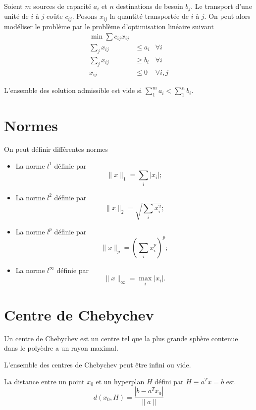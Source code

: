 \begin{myexem}
  Soient $m$ sources de capacité $a_i$ et
  $n$ destinations de besoin $b_j$.
  Le transport d'une unité de $i$ à $j$ coûte $c_{ij}$.
  Posons $x_{ij}$ la quantité transportée de $i$ à $j$.
  On peut alors modéliser le problème par le problème d'optimisation linéaire
  suivant
  \begin{align*}
    \min \sum c_{ij} x_{ij}\\
    \sum_j x_{ij} & \leq a_i & \forall i\\
    \sum_j x_{ij} & \geq b_i & \forall i\\
    x_{ij} & \leq 0 & \forall i,j
  \end{align*}

  L'ensemble des solution admissible est vide si
  $\sum_1^m a_i < \sum_1^n b_i$.
\end{myexem}

\section{Normes}
On peut définir différentes normes
\begin{itemize}
  \item La norme $l^1$ définie par
    \[ \|x\|_1 = \sum_i |x_i|; \]
  \item La norme $l^2$ définie par
    \[ \|x\|_2 = \sqrt{\sum_i x_i^2}; \]
  \item La norme $l^p$ définie par
    \[ \|x\|_p = \left(\sum_i x_i^p\right)^p; \]
  \item La norme $l^\infty$ définie par
    \[ \|x\|_\infty = \max_i |x_i|. \]
\end{itemize}

\section{Centre de Chebychev}
\begin{mydef}
  Un centre de Chebychev est un centre tel que la plus grande sphère
  contenue dans le polyèdre a un rayon maximal.
\end{mydef}
\begin{myrem}
  L'ensemble des centres de Chebychev peut être infini ou vide.
\end{myrem}
\begin{myprop}
  La distance entre un point $x_0$ et
  un hyperplan $H$ défini par $H\equiv a^Tx = b$ est
  \[ d(x_0, H) = \frac{|b-a^Tx_0|}{\|a\|} \]
\end{myprop}

